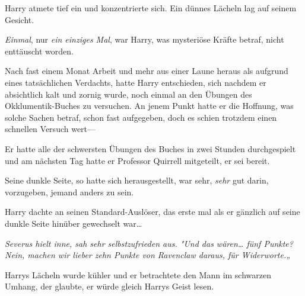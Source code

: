Harry atmete tief ein und konzentrierte sich. Ein dünnes Lächeln lag auf seinem Gesicht.

\emph{Einmal}, nur \emph{ein einziges Mal}, war Harry, was mysteriöse Kräfte betraf, nicht enttäuscht worden.

Nach fast einem Monat Arbeit und mehr aus einer Laune heraus als aufgrund eines tatsächlichen Verdachts, hatte Harry entschieden, sich nachdem er absichtlich kalt und zornig wurde, noch einmal an den Übungen des Okklumentik-Buches zu versuchen. An jenem Punkt hatte er die Hoffnung, was solche Sachen betraf, schon fast aufgegeben, doch es schien trotzdem einen schnellen Versuch wert—

Er hatte alle der schwersten Übungen des Buches in zwei Stunden durchgespielt und am nächsten Tag hatte er Professor Quirrell mitgeteilt, er sei bereit.

Seine dunkle Seite, so hatte sich herausgestellt, war sehr, \emph{sehr} gut darin, vorzugeben, jemand anders zu sein.

Harry dachte an seinen Standard-Auslöser, das erste mal als er gänzlich auf seine dunkle Seite hinüber gewechselt war…

\emph{Severus hielt inne, sah sehr selbstzufrieden aus. "Und das wären… fünf Punkte? Nein, machen wir lieber zehn Punkte von Ravenclaw daraus, für Widerworte.„}

Harrys Lächeln wurde kühler und er betrachtete den Mann im schwarzen Umhang, der glaubte, er würde gleich Harrys Geist lesen.

